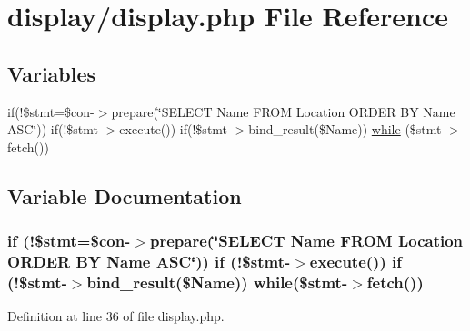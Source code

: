 \hypertarget{display_8php}{}\section{display/display.php File Reference}
\label{display_8php}
\subsection*{Variables}
\begin{DoxyCompactItemize}
\item 
if(!\$stmt=\$con-\/$>$prepare(\char`\"{}S\+E\+L\+E\+CT Name F\+R\+OM Location O\+R\+D\+ER BY Name A\+SC\char`\"{})) if(!\$stmt-\/$>$execute()) if(!\$stmt-\/$>$bind\+\_\+result(\$Name)) \hyperlink{display_8php_a0513dda8b0dc08a6c03605a231c4b08d}{while} (\$stmt-\/$>$fetch())
\end{DoxyCompactItemize}


\subsection{Variable Documentation}
\subsubsection[{\texorpdfstring{while}{while}}]{\setlength{\rightskip}{0pt plus 5cm}if (!\$stmt=\$con-\/$>$prepare(\char`\"{}S\+E\+L\+E\+CT Name F\+R\+OM Location O\+R\+D\+ER BY Name A\+SC\char`\"{})) if (!\$stmt-\/$>$execute()) if (!\$stmt-\/$>$bind\+\_\+result(\$Name)) while(\$stmt-\/$>$fetch())}\hypertarget{display_8php_a0513dda8b0dc08a6c03605a231c4b08d}{}\label{display_8php_a0513dda8b0dc08a6c03605a231c4b08d}


Definition at line 36 of file display.\+php.

